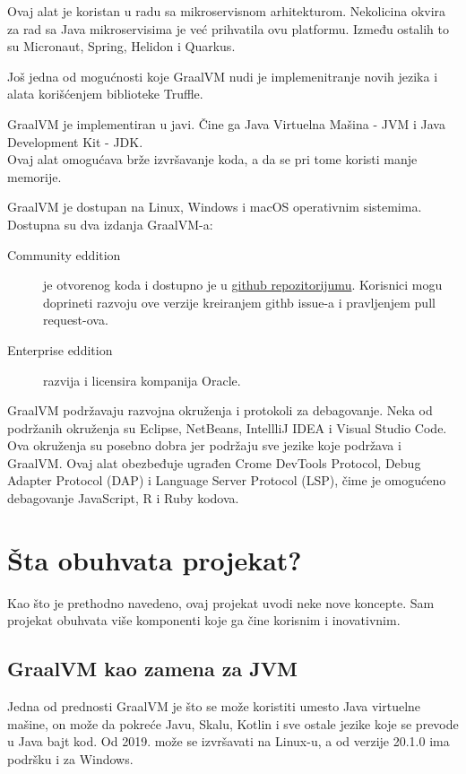 \documentclass[a4paper]{article}
\begin{document}
Ovaj alat je koristan u radu sa mikroservisnom arhitekturom. Nekolicina okvira za rad sa Java mikroservisima je već prihvatila ovu platformu. Između ostalih to su Micronaut, Spring, Helidon i Quarkus. 

Još jedna od mogućnosti koje GraalVM nudi je implemenitranje novih jezika i alata korišćenjem biblioteke Truffle.

GraalVM je implementiran u javi. Čine ga Java Virtuelna Mašina - JVM i Java Development Kit - JDK. \\
Ovaj alat omogućava brže izvršavanje koda, a da se pri tome koristi manje memorije.

GraalVM je dostupan na Linux, Windows i macOS operativnim sistemima. \\

Dostupna su dva izdanja GraalVM-a:

\begin{description}
	\item [Community eddition] je otvorenog koda i dostupno je u \href{https://github.com/oracle/graal}{github repozitorijumu}. Korisnici mogu doprineti razvoju ove verzije kreiranjem githb issue-a i pravljenjem pull request-ova.
	\item [Enterprise eddition] razvija i licensira kompanija Oracle.
\end{description}

GraalVM podržavaju razvojna okruženja i protokoli za debagovanje. Neka od podržanih okruženja su Eclipse, NetBeans, IntellliJ IDEA i Visual Studio Code. Ova okruženja su posebno dobra jer podržaju sve jezike koje podržava i GraalVM. Ovaj alat obezbeđuje ugrađen Crome DevTools Protocol, Debug Adapter Protocol (DAP) i Language Server Protocol (LSP), čime je omogućeno debagovanje JavaScript, R i Ruby kodova.

\section{Šta obuhvata projekat?}
\label{sec:Šta obuhvata projekat?}
Kao što je prethodno navedeno, ovaj projekat uvodi neke nove koncepte.
Sam projekat obuhvata više komponenti koje ga čine korisnim i inovativnim.

\subsection{GraalVM kao zamena za JVM}
\label{sub:GraalVM kao zamena za JVM}

Jedna od prednosti GraalVM je što se može koristiti umesto Java virtuelne mašine, on može da pokreće Javu, Skalu, Kotlin i sve ostale jezike koje se prevode u Java bajt kod. Od 2019. može se izvršavati na Linux-u, a od verzije 20.1.0 ima podršku i za Windows. \\
\end{document}
